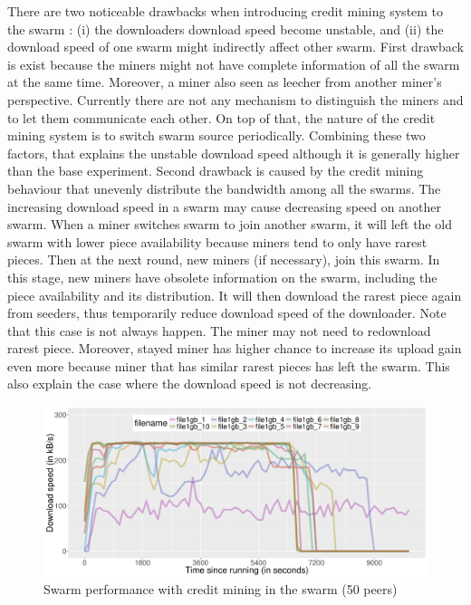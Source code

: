 There are two noticeable drawbacks when introducing credit mining system to the swarm : (i) the downloaders download speed become unstable, and (ii) the download speed of one swarm might indirectly affect other swarm. First drawback is exist because the miners might not have complete information of all the swarm at the same time. Moreover, a miner also seen as leecher from another miner's perspective. Currently there are not any mechanism to distinguish the miners and to let them communicate each other. On top of that, the nature of the credit mining system is to switch swarm source periodically. Combining these two factors, that explains the unstable download speed although it is generally higher than the base experiment. Second drawback is caused by the credit mining behaviour that unevenly distribute the bandwidth among all the swarms. The increasing download speed in a swarm may cause decreasing speed on another swarm. When a miner switches swarm to join another swarm, it will left the old swarm with lower piece availability because miners tend to only have rarest pieces. Then at the next round, new miners (if necessary), join this swarm. In this stage, new miners have obsolete information on the swarm, including the piece availability and its distribution. It will then download the rarest piece again from seeders, thus temporarily reduce download speed of the downloader.  Note that this case is not always happen. The miner may not need to redownload rarest piece. Moreover, stayed miner has higher chance to increase its upload gain even more because miner that has similar rarest pieces has left the swarm. This also explain the case where the download speed is not decreasing.

\begin{figure}[h!]
	\centering
	\includegraphics[width=\textwidth]{pics/results/swperf_sc2.png}
	\caption{Swarm performance with credit mining in the swarm (50 peers)}
	\label{fig:swarmcmperf}
\end{figure}

